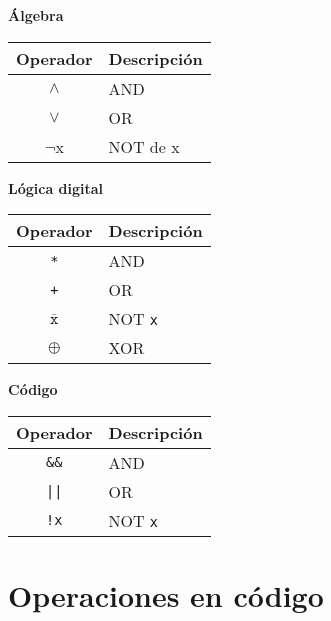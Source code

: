 \documentclass[a4paper,10pt]{article}
\begin{document}
\begin{multicols}{3}
    \begin{center}
    \textbf{Álgebra}\\
    \begin{tabular}{c|p{2.15cm}}
    \small Operador & \small Descripción\\
    \hline
    $\wedge$    & \small AND \\
    $\vee$      & \small OR \\
    $\neg$x      & \small NOT de x\\
    \end{tabular}
    \end{center}
\columnbreak
    \begin{center}
    \textbf{Lógica digital}\\
    \begin{tabular}{c|p{2.15cm}}
    \small Operador & \small Descripción\\
    \hline
    \verb|*|    & \small AND \\
    \verb|+|    & \small OR \\
    $\overline{\texttt{x}}$ & \small NOT \verb|x| \\
    $\oplus$    & \small XOR \\
    \end{tabular}
    \end{center}
\columnbreak
    \begin{center}
    \textbf{Código}\\
    \begin{tabular}{c|p{2.15cm}}
    \small Operador & \small Descripción\\
    \hline
    \verb|&&|    & \small AND \\
    \verb.||.    & \small OR \\
    \verb|!x|     & \small NOT \verb|x| \\
    \end{tabular}
    \end{center}
\end{multicols}

\section*{Operaciones en código}
 
\end{document}
